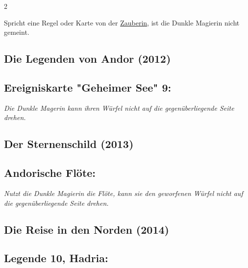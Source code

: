 \documentclass[10pt, a4paper, oneside]{book}
\newcommand{\fan}[1]{\textit{#1}}
\begin{document}
\begin{multicols*}{2}
\begin{nobgcolor}
Spricht eine Regel oder Karte von der \hyperref[zauberin]{Zauberin}, ist die Dunkle Magierin nicht gemeint.





\end{nobgcolor}





\begin{bgcolor}

\section{Die Legenden von Andor (2012)}

\subsection{Ereigniskarte "Geheimer See" 9:}

\fan{Die Dunkle Magerin kann ihren Würfel nicht auf die gegenüberliegende Seite drehen.}


\end{bgcolor}






\begin{bgcolor}
\section{Der Sternenschild (2013)}


\subsection{Andorische Flöte:}

\fan{Nutzt die Dunkle Magierin die Flöte, kann sie den geworfenen Würfel nicht auf die gegenüberliegende Seite drehen.}

\end{bgcolor}


\begin{bgcolor}
\section{Die Reise in den Norden (2014)}





\subsection{Legende 10, Hadria:}


\end{bgcolor}
\end{multicols*}
\end{document}
